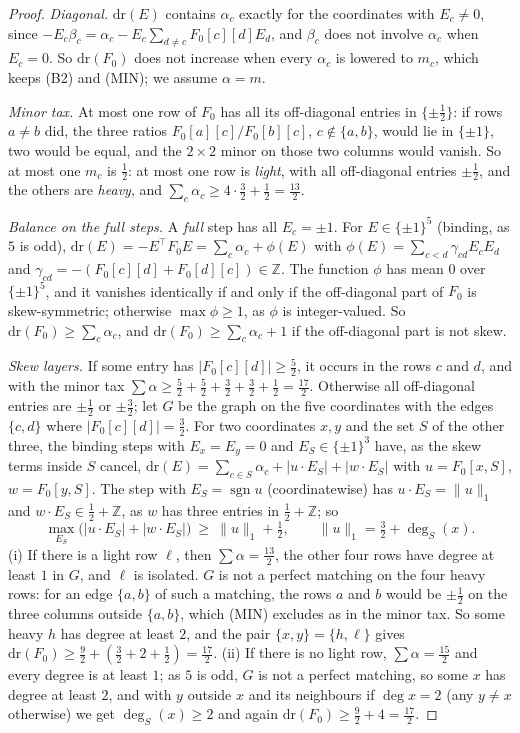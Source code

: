 \documentclass[11pt]{amsart}
\theoremstyle{definition}
\theoremstyle{plain}
\newcommand{\Z}{\mathbb{Z}}
\DeclareMathOperator{\sgn}{sgn}
\begin{document}
\begin{proof}
\emph{Diagonal.} $\mathrm{dr}(E)$ contains $\alpha_c$ exactly for the coordinates with $E_c\ne0$, since $-E_c\beta_c=\alpha_c-E_c\sum_{d\ne c}F_0[c][d]E_d$, and $\beta_c$ does not involve $\alpha_c$ when $E_c=0$. So $\mathrm{dr}(F_0)$ does not increase when every $\alpha_c$ is lowered to $m_c$, which keeps (B2) and (MIN); we assume $\alpha=m$.

\emph{Minor tax.} At most one row of $F_0$ has all its off-diagonal entries in $\{\pm\frac12\}$: if rows $a\ne b$ did, the three ratios $F_0[a][c]/F_0[b][c]$, $c\notin\{a,b\}$, would lie in $\{\pm1\}$, two would be equal, and the $2\times2$ minor on those two columns would vanish. So at most one $m_c$ is $\frac12$: at most one row is \emph{light}, with all off-diagonal entries $\pm\frac12$, and the others are \emph{heavy}, and $\sum_c\alpha_c\ge4\cdot\frac32+\frac12=\frac{13}2$.

\emph{Balance on the full steps.} A \emph{full} step has all $E_c=\pm1$. For $E\in\{\pm1\}^5$ (binding, as $5$ is odd), $\mathrm{dr}(E)=-E^{\!\top}F_0E=\sum_c\alpha_c+\phi(E)$ with $\phi(E)=\sum_{c<d}\gamma_{cd}E_cE_d$ and $\gamma_{cd}=-(F_0[c][d]+F_0[d][c])\in\Z$. The function $\phi$ has mean $0$ over $\{\pm1\}^5$, and it vanishes identically if and only if the off-diagonal part of $F_0$ is skew-symmetric; otherwise $\max\phi\ge1$, as $\phi$ is integer-valued. So $\mathrm{dr}(F_0)\ge\sum_c\alpha_c$, and $\mathrm{dr}(F_0)\ge\sum_c\alpha_c+1$ if the off-diagonal part is not skew.

\emph{Skew layers.} If some entry has $|F_0[c][d]|\ge\frac52$, it occurs in the rows $c$ and $d$, and with the minor tax $\sum\alpha\ge\frac52+\frac52+\frac32+\frac32+\frac12=\frac{17}2$. Otherwise all off-diagonal entries are $\pm\frac12$ or $\pm\frac32$; let $G$ be the graph on the five coordinates with the edges $\{c,d\}$ where $|F_0[c][d]|=\frac32$. For two coordinates $x,y$ and the set $S$ of the other three, the binding steps with $E_x=E_y=0$ and $E_S\in\{\pm1\}^3$ have, as the skew terms inside $S$ cancel, $\mathrm{dr}(E)=\sum_{c\in S}\alpha_c+|u\cdot E_S|+|w\cdot E_S|$ with $u=F_0[x,S]$, $w=F_0[y,S]$. The step with $E_S=\sgn u$ (coordinatewise) has $u\cdot E_S=\|u\|_1$ and $w\cdot E_S\in\frac12+\Z$, as $w$ has three entries in $\frac12+\Z$; so
\[
\max_{E_S}\bigl(|u\cdot E_S|+|w\cdot E_S|\bigr)\ \ge\ \|u\|_1+\tfrac12,\qquad \|u\|_1=\tfrac32+\deg_S(x).
\] (i) If there is a light row $\ell$, then $\sum\alpha=\frac{13}2$, the other four rows have degree at least $1$ in $G$, and $\ell$ is isolated. $G$ is not a perfect matching on the four heavy rows: for an edge $\{a,b\}$ of such a matching, the rows $a$ and $b$ would be $\pm\frac12$ on the three columns outside $\{a,b\}$, which (MIN) excludes as in the minor tax. So some heavy $h$ has degree at least $2$, and the pair $\{x,y\}=\{h,\ell\}$ gives $\mathrm{dr}(F_0)\ge\frac92+(\frac32+2+\frac12)=\frac{17}2$. (ii) If there is no light row, $\sum\alpha=\frac{15}2$ and every degree is at least $1$; as $5$ is odd, $G$ is not a perfect matching, so some $x$ has degree at least $2$, and with $y$ outside $x$ and its neighbours if $\deg x=2$ (any $y\ne x$ otherwise) we get $\deg_S(x)\ge2$ and again $\mathrm{dr}(F_0)\ge\frac92+4=\frac{17}2$.


\end{proof}
\end{document}
